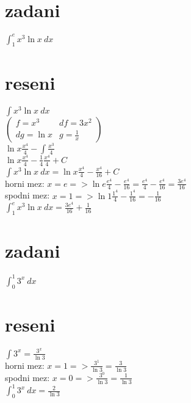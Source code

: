 \documentclass[a4paper]{article}
\def\doubleunderline#1{\underline{\underline{#1}}}
\begin{document}
\section*{zadani}
$\int_{1}^{e} x^3 \ln x ~dx$

\section*{reseni}
$\int x^3 \ln x ~dx$\\
$\left(
	\begin{matrix}
		f=x^3 & df=3x^2\\
		dg=\ln x & g=\frac{1}{x}
	\end{matrix}
\right)$\\
$\ln x \frac{x^4}{4}-\int\frac{x^3}{4}$\\
$\ln x \frac{x^4}{4}-\frac{1}{4}\frac{x^4}{4}+C$\\
$\int x^3 \ln x ~dx = \ln x \frac{x^4}{4}-\frac{x^4}{16}+C$\\
horni mez: $x=e => \ln e \frac{e^4}{4}-\frac{e^4}{16} = \frac{e^4}{4}-\frac{e^4}{16} = \frac{3e^4}{16}$\\
spodni mez: $ x=1 => \ln 1 \frac{1^4}{4}-\frac{1^4}{16} = -\frac{1}{16}$\\
\doubleunderline{$\int_{1}^{e} x^3 \ln x ~dx = \frac{3e^4}{16} + \frac{1}{16}$}












\section*{zadani}
$\int_{0}^{1} 3^x ~dx$

\section*{reseni}
$\int 3^x = \frac{3^x}{\ln 3}$\\
horni mez: $ x=1 => \frac{3^1}{\ln 3} = \frac{3}{\ln 3} $\\
spodni mez: $x=0 => \frac{3^0}{\ln 3} = \frac{1}{\ln 3}$\\
\doubleunderline{$\int_{0}^{1} 3^x ~dx = \frac{2}{\ln 3}$}
\end{document}
